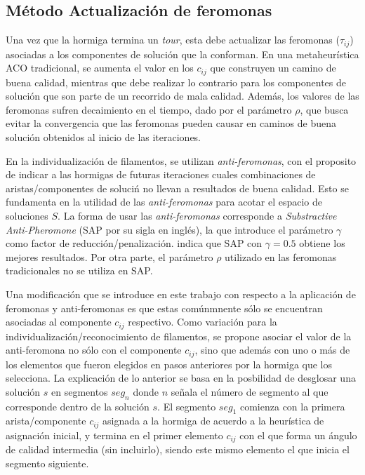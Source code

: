 \subsection{M\'etodo Actualizaci\'on de feromonas}
\label{subsec:pheroUpdate}
Una vez que la hormiga termina un {\it tour}, esta debe actualizar las feromonas ($\tau_{ij}$) asociadas a los componentes de soluci\'on que la conforman. En una metaheur\'istica ACO tradicional, se aumenta el valor en los $c_{ij}$ que construyen un camino de buena calidad, mientras que debe realizar lo contrario para los componentes de soluci\'on que son parte de un recorrido de mala calidad. Adem\'as, los valores de las feromonas sufren decaimiento en el tiempo, dado por el par\'ametro $\rho$, que busca evitar la convergencia que las feromonas pueden causar en caminos de buena soluci\'on obtenidos al inicio de las iteraciones.


En la individualizaci\'on de filamentos, se utilizan {\it anti-feromonas}, con el proposito de indicar a las hormigas de futuras iteraciones cuales combinaciones de aristas/componentes de soluci\'n no llevan a resultados de buena calidad. Esto se fundamenta en la utilidad de las {\it anti-feromonas} para acotar el espacio de soluciones $S$. La forma de usar las {\it anti-feromonas} corresponde a {\it Substractive Anti-Pheromone} (SAP por su sigla en ingl\'es), la que introduce el par\'ametro $\gamma$ como factor de reducci\'on/penalizaci\'on. \cite{montgomery2002anti} indica que SAP con $\gamma = 0.5$ obtiene los mejores resultados. Por otra parte, el par\'ametro $\rho$ utilizado en las feromonas tradicionales no se utiliza en SAP.


Una modificaci\'on que se introduce en este trabajo con respecto a la aplicaci\'on de  feromonas y anti-feromonas es que estas com\'unmnente s\'olo se encuentran asociadas al componente $c_{ij}$ respectivo. Como variaci\'on para la individualizaci\'on/reconocimiento de filamentos, se propone asociar el valor de la anti-feromona no s\'olo con el componente $c_{ij}$, sino que adem\'as con uno o m\'as de los elementos que fueron elegidos en pasos anteriores por la hormiga que los selecciona. La explicaci\'on de lo anterior se basa en la posbilidad de desglosar una soluci\'on $s$ en segmentos $seg_{n}$ donde $n$ se\~nala el n\'umero de segmento al que corresponde dentro de la soluci\'on $s$. El segmento $seg_1$ comienza con la primera arista/componente $c_{ij}$ asignada a la hormiga de acuerdo a la heur\'istica de asignaci\'on inicial, y termina en el primer elemento $c_{ij}$ con el que forma un \'angulo de calidad intermedia (sin incluirlo), siendo este mismo elemento el que inicia el segmento siguiente.


